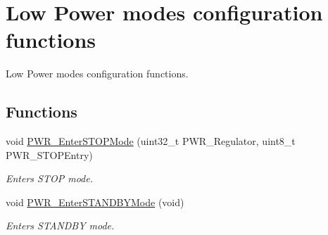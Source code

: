 \hypertarget{group___p_w_r___group6}{\section{Low Power modes configuration functions}
\label{group___p_w_r___group6}
}


Low Power modes configuration functions.  


\subsection*{Functions}
\begin{DoxyCompactItemize}
\item 
void \hyperlink{group___p_w_r___group6_ga694676ac06a9baf50eae45adae0118ab}{P\-W\-R\-\_\-\-Enter\-S\-T\-O\-P\-Mode} (uint32\-\_\-t P\-W\-R\-\_\-\-Regulator, uint8\-\_\-t P\-W\-R\-\_\-\-S\-T\-O\-P\-Entry)
\begin{DoxyCompactList}\small\item\em Enters S\-T\-O\-P mode. \end{DoxyCompactList}\item 
void \hyperlink{group___p_w_r___group6_ga00ddae00a9c327b81b24d2597b0052f3}{P\-W\-R\-\_\-\-Enter\-S\-T\-A\-N\-D\-B\-Y\-Mode} (void)
\begin{DoxyCompactList}\small\item\em Enters S\-T\-A\-N\-D\-B\-Y mode. \end{DoxyCompactList}\end{DoxyCompactItemize}


